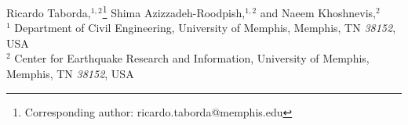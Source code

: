 % 
Ricardo Taborda,$^{1,2}$\thanks{Corresponding author: ricardo.taborda@memphis.edu}
Shima Azizzadeh-Roodpish,$^{1,2}$ and
Naeem Khoshnevis,$^{2}$\\
% 
$^1$ Department of Civil Engineering, University of Memphis, Memphis, TN \emph{38152}, USA\\
$^2$ Center for Earthquake Research and Information, University of Memphis, Memphis, TN \emph{38152}, USA
% 